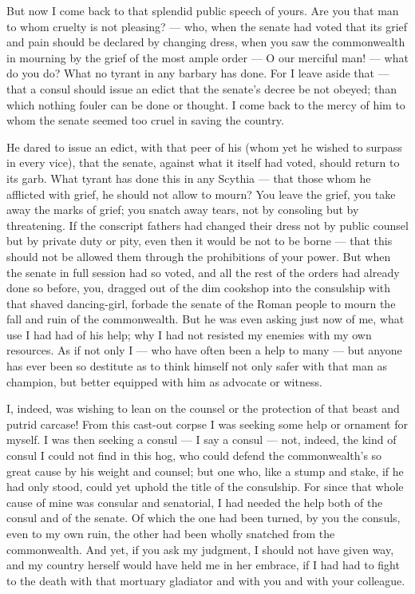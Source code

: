  But now I come back to that splendid public speech of yours. Are you that man to whom cruelty is not pleasing? — who, when the senate had voted that its grief and pain should be declared by changing dress, when you saw the commonwealth in mourning by the grief of the most ample order — O our merciful man! — what do you do? What no tyrant in any barbary has done. For I leave aside that — that a consul should issue an edict that the senate's decree be not obeyed; than which nothing fouler can be done or thought. I come back to the mercy of him to whom the senate seemed too cruel in saving the country.

 He dared to issue an edict, with that peer of his (whom yet he wished to surpass in every vice), that the senate, against what it itself had voted, should return to its garb. What tyrant has done this in any Scythia — that those whom he afflicted with grief, he should not allow to mourn? You leave the grief, you take away the marks of grief; you snatch away tears, not by consoling but by threatening. If the conscript fathers had changed their dress not by public counsel but by private duty or pity, even then it would be not to be borne — that this should not be allowed them through the prohibitions of your power. But when the senate in full session had so voted, and all the rest of the orders had already done so before, you, dragged out of the dim cookshop into the consulship with that shaved dancing-girl, forbade the senate of the Roman people to mourn the fall and ruin of the commonwealth. But he was even asking just now of me, what use I had had of his help; why I had not resisted my enemies with my own resources. As if not only I — who have often been a help to many — but anyone has ever been so destitute as to think himself not only safer with that man as champion, but better equipped with him as advocate or witness.

 I, indeed, was wishing to lean on the counsel or the protection of that beast and putrid carcase! From this cast-out corpse I was seeking some help or ornament for myself. I was then seeking a consul — I say a consul — not, indeed, the kind of consul I could not find in this hog, who could defend the commonwealth's so great cause by his weight and counsel; but one who, like a stump and stake, if he had only stood, could yet uphold the title of the consulship. For since that whole cause of mine was consular and senatorial, I had needed the help both of the consul and of the senate. Of which the one had been turned, by you the consuls, even to my own ruin, the other had been wholly snatched from the commonwealth. And yet, if you ask my judgment, I should not have given way, and my country herself would have held me in her embrace, if I had had to fight to the death with that mortuary gladiator and with you and with your colleague.

